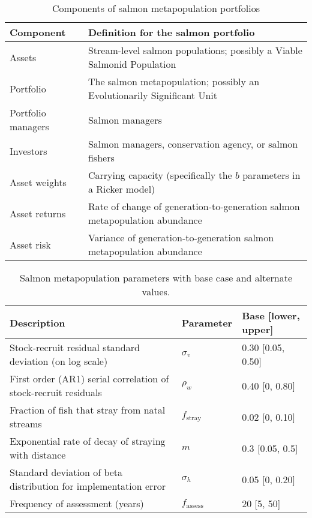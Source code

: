 \begin{table}[h!]
\centering
\small
\caption{Components of salmon metapopulation portfolios}
\begin{tabular}{p{3.6cm}p{7.5cm}}
\toprule
Component          & Definition for the salmon portfolio\\
\midrule
Assets             & Stream-level salmon populations; possibly a Viable Salmonid Population\\
Portfolio          & The salmon metapopulation; possibly an Evolutionarily Significant Unit\\
Portfolio managers & Salmon managers\\
Investors          & Salmon managers, conservation agency, or salmon fishers\\
Asset weights      & Carrying capacity (specifically the $b$ parameters in a Ricker model)\\
Asset returns      & Rate of change of generation-to-generation salmon metapopulation abundance\\
Asset risk         & Variance of generation-to-generation salmon metapopulation abundance\\
\bottomrule
\end{tabular}
\label{t:port}
\end{table}

\clearpage

\begin{table}[h!]
\centering
\small
\caption{Salmon metapopulation parameters with base case and alternate values.}
\begin{tabular}{p{7.0cm}p{1.6cm}p{3.2cm}}
\toprule
Description                                                      & Parameter             & Base [lower, upper] \\
\midrule
Stock-recruit residual standard deviation (on log scale)         & $\sigma_v$            & 0.30 [0.05, 0.50] \\
First order (AR1) serial correlation of stock-recruit residuals  & $\rho_w$              & 0.40 [0, 0.80] \\
Fraction of fish that stray from natal streams                   & $f_{\mathrm{stray}}$  & 0.02 [0, 0.10] \\
Exponential rate of decay of straying with distance              & $m$                   & 0.3 [0.05, 0.5] \\
Standard deviation of beta distribution for implementation error & $\sigma_{h}$          & 0.05 [0, 0.20] \\
Frequency of assessment (years)                                  & $f_{\mathrm{assess}}$ & 20 [5, 50] \\
\bottomrule
\end{tabular}
\label{tab:salm-pars}
\end{table}

